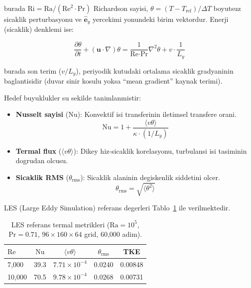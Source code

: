 \noindent burada $\text{Ri} = \text{Ra}/(\text{Re}^2 \cdot \text{Pr})$
Richardson sayisi, $\theta = (T - T_\text{ref})/\Delta T$ boyutsuz sicaklik
perturbasyonu ve $\hat{\mathbf{e}}_y$ yercekimi yonundeki birim vektordur.
Enerji (sicaklik) denklemi ise:

\begin{equation}
  \frac{\partial \theta}{\partial t}
  + (\mathbf{u} \cdot \nabla)\theta
  = \frac{1}{\text{Re}\cdot\text{Pr}}\nabla^2 \theta
  + v \cdot \frac{1}{L_y}
  \label{eq:energy-boussinesq}
\end{equation}

\noindent burada son terim ($v/L_y$), periyodik kutudaki ortalama sicaklik
gradyaninin baglantisidir (duvar sinir kosulu yoksa ``mean gradient'' kaynak
terimi).

Hedef buyuklukler su sekilde tanimlanmistir:

\begin{itemize}
  \item \textbf{Nusselt sayisi} ($\text{Nu}$): Konvektif isi transferinin
        iletimsel transfere orani.
        \begin{equation}
          \text{Nu} = 1 + \frac{\langle v\theta \rangle}{\kappa \cdot (1/L_y)}
          \label{eq:nusselt-def}
        \end{equation}
  \item \textbf{Termal flux} ($\langle v\theta \rangle$): Dikey hiz-sicaklik
        korelasyonu, turbulansi isi tasiminin dogrudan olcusu.
  \item \textbf{Sicaklik RMS} ($\theta_\text{rms}$): Sicaklik alaninin
        degiskenlik siddetini olcer.
        \begin{equation}
          \theta_\text{rms} = \sqrt{\langle \theta^2 \rangle}
          \label{eq:theta-rms-def}
        \end{equation}
\end{itemize}

LES (Large Eddy Simulation) referans degerleri Tablo~\ref{tab:les-thermal-ref}
ile verilmektedir.

\begin{table}[H]
  \centering
  \caption{LES referans termal metrikleri ($\text{Ra} = 10^5$, $\text{Pr} = 0.71$,
           $96 \times 160 \times 64$ grid, 60{,}000 adim).}
  \label{tab:les-thermal-ref}
  \begin{tabular}{lcccc}
    \toprule
    $\text{Re}$ & $\text{Nu}$ & $\langle v\theta \rangle$ & $\theta_\text{rms}$ & TKE \\
    \midrule
    7{,}000  & 39.3  & $7.71 \times 10^{-4}$ & 0.0240 & 0.00848 \\
    10{,}000 & 70.5  & $9.78 \times 10^{-4}$ & 0.0268 & 0.00731 \\
    \bottomrule
  \end{tabular}
\end{table}


